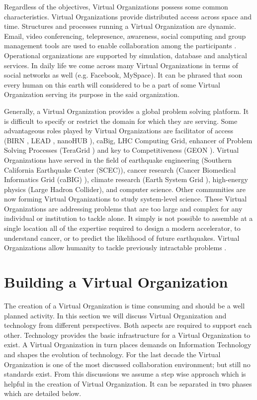 \documentclass[]{article}
\begin{document}
Regardless of the objectives, Virtual Organizations possess some common characteristics. Virtual Organizations provide distributed access across space and time. Structures and processes running a Virtual Organization are dynamic. Email, video conferencing, telepresence, awareness, social computing and group management tools are used to enable collaboration among the participants \cite{Kesselman2008}. Operational organizations are supported by simulation, database and analytical services. In daily life we come across many Virtual Organizations in terms of social networks as well (e.g. Facebook, MySpace). It can be phrased that soon every human on this earth will considered to be a part of some Virtual Organization serving its purpose in the said organization.

Generally, a Virtual Organization provides a global problem solving platform. It is difficult to specify or restrict the domain for which they are serving. Some advantageous roles played by Virtual Organizations are facilitator of access (BIRN \cite{birn}, LEAD \cite{lead}, nanoHUB \cite{nanohub}), caBig\cite{cabig}, LHC Computing Grid, enhancer of Problem Solving Processes (TeraGrid \cite{teragrid}) and  key to Competitiveness (GEON \cite{geon}). Virtual Organizations have served in the field of earthquake engineering (Southern California Earthquake Center (SCEC)), cancer research (Cancer Biomedical Informatics Grid (caBIG) \cite{cabig}), climate research (Earth System Grid \cite{earthsystemgrid}), high-energy physics (Large Hadron Collider), and computer science. Other communities are now forming Virtual Organizations to study system-level science. These Virtual Organizations are addressing problems that are too large and complex for any individual or institution to tackle alone. It simply is not possible to assemble at a single location all of the expertise required to design a modern accelerator, to understand cancer, or to predict the likelihood of future earthquakes. Virtual Organizations allow humanity to tackle previously intractable problems \cite{Kesselman2008}.



\section{Building a Virtual Organization}\label{sec:creatingVO}
The creation of a Virtual Organization is time consuming and should be a well planned activity. In this section we will discuss Virtual Organization and technology from different perspectives. Both aspects are required to support each other. Technology provides the basic infrastructure for a Virtual Organization to exist. A Virtual Organization in turn places demands on Information Technology and shapes the evolution of technology. For the last decade the Virtual Organization is one of the most discussed collaboration environment; but still no standards exist.
From this discussions we assume a step wise approach which is helpful in the creation of Virtual Organization. It can be separated in two phases which are detailed below.
\end{document}
